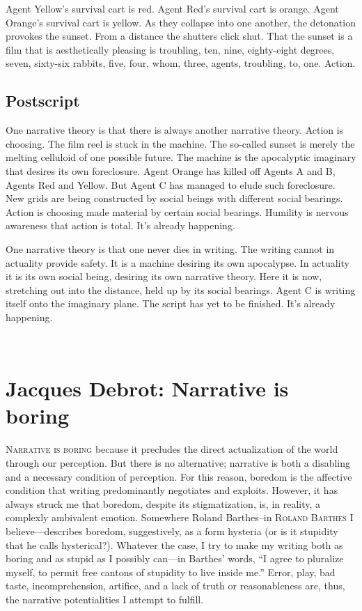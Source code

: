 \documentclass[
]{memoir}
\begin{document}
Agent Yellow's survival cart is red. Agent Red's survival cart is
orange. Agent Orange's survival cart is yellow. As they collapse into
one another, the detonation provokes the sunset. From a distance the
shutters click shut. That the sunset is a film that is aesthetically
pleasing is troubling, ten, nine, eighty-eight degrees, seven, sixty-six
rabbits, five, four, whom, three, agents, troubling, to, one. Action.

\hypertarget{postscript}{%
\section*{Postscript}\label{postscript}}

One narrative theory is that there is always another narrative theory.
Action is choosing. The film reel is stuck in the machine. The so-called
sunset is merely the melting celluloid of one possible future. The
machine is the apocalyptic imaginary that desires its own foreclosure.
Agent Orange has killed off Agents A and B, Agents Red and Yellow. But
Agent C has managed to elude such foreclosure. New grids are being
constructed by social beings with different social bearings. Action is
choosing made material by certain social bearings. Humility is nervous
awareness that action is total. It's already happening.

One narrative theory is that one never dies in writing. The writing
cannot in actuality provide safety. It is a machine desiring its own
apocalypse. In actuality it is its own social being, desiring its own
narrative theory. Here it is now, stretching out into the distance, held
up by its social bearings. Agent C is writing itself onto the imaginary
plane. The script has yet to be finished. It's already happening.

~

\hypertarget{jacques-debrot-narrative-is-boring}{%
\chapter{Jacques Debrot: Narrative is
boring}\label{jacques-debrot-narrative-is-boring}}

\lettrine[lines=3, findent=0em, nindent=0.1em, lhang=0]{N}{arrative is boring}
because it precludes the direct actualization of the world through our
perception. But there is no alternative; narrative is both a disabling
and a necessary condition of perception. For this reason, boredom is the
affective condition that writing predominantly negotiates and exploits.
However, it has always struck me that boredom, despite its
stigmatization, is, in reality, a complexly ambivalent emotion.
Somewhere Roland Barthes--in \textsc{Roland Barthes} I
believe---describes boredom, suggestively, as a form hysteria (or is it
stupidity that he calls hysterical?). Whatever the case, I try to make
my writing both as boring and as stupid as I possibly can---in Barthes'
words, ``I agree to pluralize myself, to permit free cantons of
stupidity to live inside me.'' Error, play, bad taste, incomprehension,
artifice, and a lack of truth or reasonableness are, thus, the narrative
potentialities I attempt to fulfill.
\end{document}
